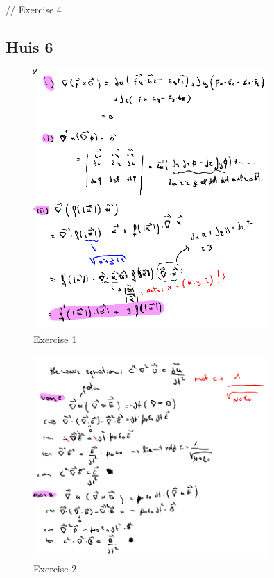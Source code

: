 \documentclass[a4paper]{article}
\begin{document}
// Exercise 4


\subsection*{Huis 6}


\begin{figure}[H]
	\centering
	\includegraphics[width=0.8\textwidth]{assets/huis_6_ex_1.png}
	\caption{Exercise 1}
	\label{fig:huis_6_ex_1}
\end{figure}


\begin{figure}[H]
	\centering
	\includegraphics[width=0.8\textwidth]{assets/huis_6_ex_2.png}
	\caption{Exercise 2}
	\label{fig:huis_6_ex_2}
\end{figure}
\end{document}
